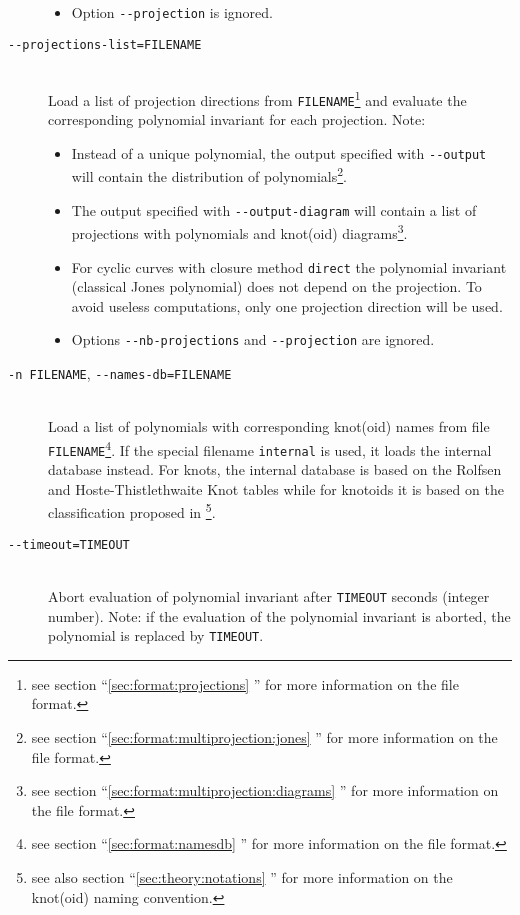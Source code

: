 \begin{description}
\begin{itemize}
    \item Option \lstinline{--projection} is ignored.                                  
  \end{itemize}
\item[\lstinline{--projections-list=FILENAME}]\hfill\\
  Load a list of projection directions from \lstinline{FILENAME}\footnote{see section ``\ref{sec:format:projections} '' for more information on the file format.} and evaluate the corresponding polynomial invariant for each projection. Note:
  \begin{itemize}
  \item Instead of a unique polynomial, the output specified with \lstinline{--output} will contain the distribution of polynomials\footnote{see section ``\ref{sec:format:multiprojection:jones} '' for more information on the file format.}. 
    \item The output specified with \lstinline{--output-diagram} will contain a list of projections with polynomials and knot(oid) diagrams\footnote{see section ``\ref{sec:format:multiprojection:diagrams} '' for more information on the file format.}.
    \item For cyclic curves with closure method \lstinline{direct} the polynomial invariant (classical Jones polynomial) does not depend on the projection. To avoid useless computations, only one projection direction will be used.
    \item Options  \lstinline{--nb-projections} and \lstinline{--projection} are ignored.                                  
  \end{itemize}
\item[\lstinline{-n FILENAME}, \lstinline{--names-db=FILENAME}]\hfill\\
  Load a list of polynomials with corresponding knot(oid) names from file \lstinline{FILENAME}\footnote{see section ``\ref{sec:format:namesdb} '' for more information on the file format.}. If the special filename \lstinline{internal} is used, it loads the internal database instead. For knots, the internal database is based on the Rolfsen and Hoste-Thistlethwaite Knot tables while for knotoids it is based on the classification proposed in \cite{goundaroulis2019}\footnote{see also section ``\ref{sec:theory:notations} '' for more information on the knot(oid) naming convention.}.
\item[\lstinline{--timeout=TIMEOUT}]\hfill\\
  Abort evaluation of polynomial invariant after \lstinline{TIMEOUT} seconds (integer number). Note: if the evaluation of the polynomial invariant is aborted, the polynomial is replaced by \lstinline{TIMEOUT}.
\end{description}


